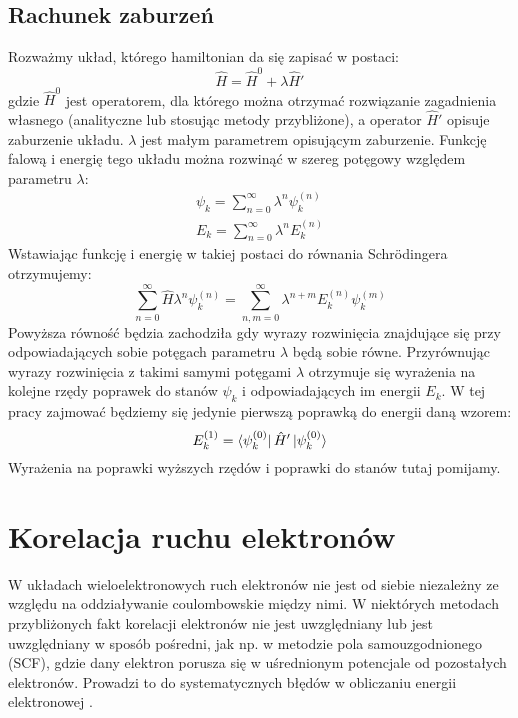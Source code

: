 \documentclass[a4paper,12pt]{article}
\numberwithin{equation}{section}
\numberwithin{table}{section}
\numberwithin{figure}{section}
\begin{document}
\subsection{Rachunek zaburzeń}
Rozważmy układ, którego hamiltonian da się zapisać w postaci:
\begin{equation}
\hat{H} = \hat{H}^0 + \lambda\hat{H}'
\end{equation}
gdzie $\hat{H}^0$ jest operatorem, dla którego można otrzymać rozwiązanie zagadnienia własnego (analityczne lub stosując metody przybliżone), a operator $\hat{H}'$ opisuje zaburzenie układu. $\lambda$ jest małym parametrem opisującym zaburzenie. Funkcję falową i energię tego układu można rozwinąć w szereg potęgowy względem parametru $\lambda$:
\begin{eqnarray}
\psi_k = \sum\limits_{n=0}^\infty \lambda^n \psi_k^{(n)} \\
E_k = \sum\limits_{n=0}^\infty \lambda^n E_k^{(n)}
\end{eqnarray}
Wstawiając funkcję i energię w takiej postaci do równania Schr\"odingera otrzymujemy:
\begin{equation}
\sum\limits_{n=0}^\infty \hat{H} \lambda^n \psi_k^{(n)} = \sum\limits_{n,m=0}^\infty \lambda^{n+m} E_k^{(n)}\psi_k^{(m)}
\end{equation}
Powyższa równość będzia zachodziła gdy wyrazy rozwinięcia znajdujące się przy odpowiadających sobie potęgach parametru $\lambda$ będą sobie równe. Przyrównując wyrazy rozwinięcia z takimi samymi potęgami $\lambda$ otrzymuje się wyrażenia na kolejne rzędy poprawek do stanów $\psi_k$ i odpowiadających im energii $E_k$. W tej pracy zajmować będziemy się jedynie pierwszą poprawką do energii daną wzorem:
\begin{equation}
E_k^{(1)} = \bra{\psi_k^{(0)}}\hat{H}'\ket{\psi_k^{(0)}}
\end{equation}
Wyrażenia na poprawki wyższych rzędów i poprawki do stanów tutaj pomijamy.
\newpage
%
%
\section{Korelacja ruchu elektronów}
W układach wieloelektronowych ruch elektronów nie jest od siebie niezależny ze względu na oddziaływanie coulombowskie między nimi. W niektórych metodach przybliżonych fakt korelacji elektronów nie jest uwzględniany lub jest uwzględniany w sposób pośredni, jak np. w metodzie pola samouzgodnionego (SCF), gdzie dany elektron porusza się w uśrednionym potencjale od pozostałych elektronów. Prowadzi to do systematycznych błędów w obliczaniu energii elektronowej \cite{piela}.
\end{document}
